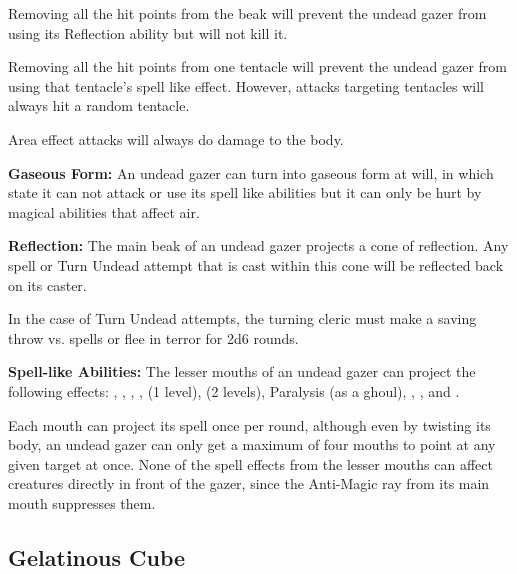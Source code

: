 \begin{multicols*}{2}
Removing all the hit points from the beak will prevent the undead gazer from using its Reflection ability but will not kill it.

Removing all the hit points from one tentacle will prevent the undead gazer from using that tentacle’s spell like effect. However, attacks targeting tentacles will always hit a random tentacle.

Area effect attacks will always do damage to the body.

\textbf{Gaseous Form:} An undead gazer can turn into gaseous form at will, in which state it can not attack or use its spell like abilities but it can only be hurt by magical abilities that affect air.

\textbf{Reflection:} The main beak of an undead gazer projects a cone of reflection. Any spell or Turn Undead attempt that is cast within this cone will be reflected back on its caster.

In the case of Turn Undead attempts, the turning cleric must make a saving throw vs. spells or flee in terror for 2d6 rounds.

\textbf{Spell-like Abilities:} The lesser mouths of an undead gazer can project the following effects: , , , ,  (1 level),  (2 levels), Paralysis (as a ghoul), , , and .

Each mouth can project its spell once per round, although even by twisting its body, an undead gazer can only get a maximum of four mouths to point at any given target at once. None of the spell effects from the lesser mouths can affect creatures directly in front of the gazer, since the Anti-Magic ray from its main mouth suppresses them.

\subsection{Gelatinous Cube}
\end{multicols*}
